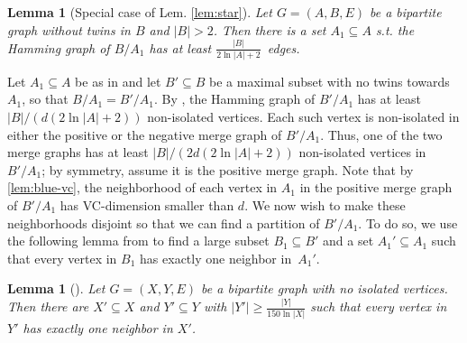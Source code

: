 \documentclass[11pt]{article}
\newtheorem{lemma}[theorem]{Lemma}
\theoremstyle{definition}
\newcommand{\inducedSS}[2]{#1/#2}%
\renewcommand{\leq}{\leqslant}
\renewcommand{\ge}{\geqslant}
\renewcommand{\subset}{\subseteq}
\begin{document}
\begin{lemma}[Special case of Lem. \ref{lem:star}]\label{lem:star0}
  Let $G=(A,B,E)$ be a bipartite graph without twins in $B$ and  $|B|>2$.
  Then there is a set $A_1\subseteq A$ 
  s.t. the Hamming graph of $\inducedSS{B}{A_1}$ has at least $\frac{|B|}{2\ln |A|+2}$~edges.
\end{lemma}

Let $A_1\subset A$ be as in 
and let $B'\subset B$ be a maximal subset with no twins towards $A_1$,
so that $\inducedSS{B}{A_1}=\inducedSS{B'}{A_1}$.
By , the Hamming graph of $\inducedSS{B'}{A_1}$ has at least 
${|B|}/({d(2\ln |A|+2)})$ non-isolated vertices.
Each such vertex is non-isolated in either the positive or the negative merge graph of $\inducedSS{B'}{A_1}$.
Thus, one of the two merge graphs has at least ${|B|}/({2d(2\ln |A|+2)})$ non-isolated vertices in $\inducedSS{B'}{A_1}$; by symmetry, assume it is the positive merge graph. Note that by \cref{lem:blue-vc}, the neighborhood of each vertex in $A_1$ in the positive merge graph of $\inducedSS{B'}{A_1}$ has VC-dimension smaller than $d$. We now wish to make these neighborhoods disjoint so that we can find a partition of $\inducedSS{B'}{A_1}$. To do so, we use the following lemma from \cite{stable_MC} to find a large subset $B_1\subset B'$ and a set $A_1'\subset A_1$ such that every vertex in $B_1$ has exactly one neighbor in~$A_1'$.

\begin{lemma}[{\cite[Lemma~10]{stable_MC}}]\label{lem:dreier-sampling}
  Let $G=(X,Y,E)$ be a bipartite graph
  with no isolated vertices. Then there are  $X'\subset X$ and $Y'\subset Y$ with $|Y'|\ge \frac{|Y|}{150\ln |X|}$ such that every vertex in $Y'$ has exactly one neighbor in $X'$.
\end{lemma}
\end{document}
